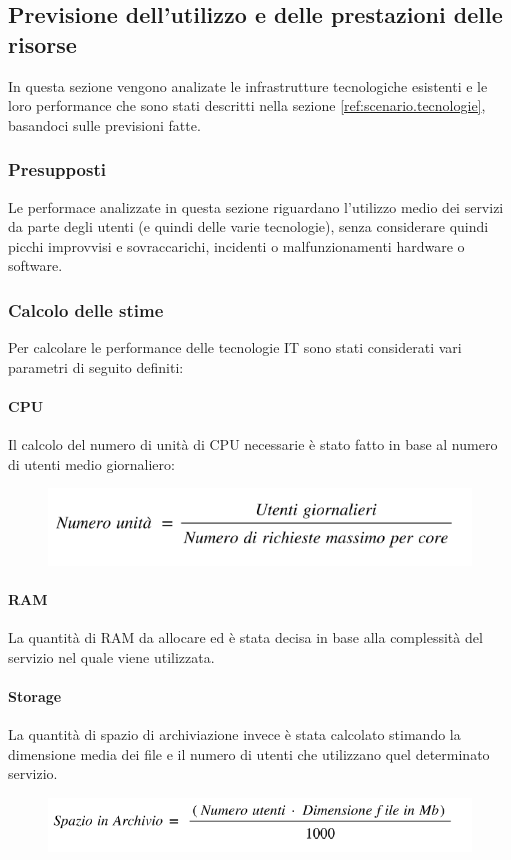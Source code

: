 \newpage
\subsection{Previsione dell'utilizzo e delle prestazioni delle risorse} \label{ref:previsione.risorse}
In questa sezione vengono analizate le infrastrutture tecnologiche esistenti e le loro performance che sono stati descritti nella sezione \ref{ref:scenario.tecnologie}, basandoci sulle previsioni fatte. \\
	\subsubsection{Presupposti}
	Le performace analizzate in questa sezione riguardano l'utilizzo medio dei servizi da parte degli utenti (e quindi delle varie tecnologie), senza considerare quindi picchi improvvisi e sovraccarichi, incidenti o malfunzionamenti hardware o software.
	
\subsubsection{Calcolo delle stime}
Per calcolare le performance delle tecnologie IT sono stati considerati vari parametri di seguito definiti:
\paragraph{CPU}
Il calcolo del numero di unità di CPU necessarie è stato fatto in base al numero di utenti medio giornaliero:\\
\begin{figure}[h!]
	\centering
	\includegraphics[width=0.5\linewidth]{./img/cpu}
\end{figure}

\paragraph{RAM}
La quantità di RAM da allocare ed è stata
decisa in base alla complessità del servizio nel quale viene utilizzata.

\paragraph{Storage}
La quantità di spazio di archiviazione invece è stata calcolato stimando la dimensione media dei file e il numero di utenti che utilizzano quel determinato servizio. \\
\begin{figure}[h!]
	\centering
	\includegraphics[width=0.5\linewidth]{./img/archivio}
\end{figure}

